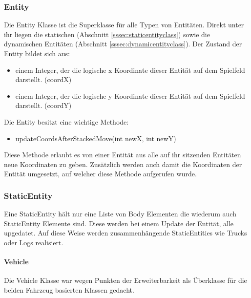 \documentclass[a4paper,10pt]{report}
\begin{document}
{{			\subsubsection{Entity}
			{
				\label{sssec:entityclass}
				
				Die Entity Klasse ist die Superklasse für alle Typen von Entitäten. 
				Direkt unter ihr liegen die statischen (Abschnitt \ref{sssec:staticentityclass}) sowie die dynamischen Entitäten (Abschnitt \ref{sssec:dynamicentityclass}).
				\newline \newline
				Der Zustand der Entity bildet sich aus:
							
				\begin{itemize}
					\item einem Integer, der die logische x Koordinate dieser Entität auf dem Spielfeld darstellt. (coordX)
					\item einem Integer, der die logische y Koordinate dieser Entität auf dem Spielfeld darstellt. (coordY)
				\end{itemize}
				\noindent
				Die Entity besitzt eine wichtige Methode: 

				\begin{itemize}
					\item updateCoordsAfterStackedMove(int newX, int newY)
				\end{itemize}								
				\noindent
				Diese Methode erlaubt es von einer Entität aus alle auf ihr sitzenden Entitäten neue Koordinaten zu geben. 
				Zusätzlich werden auch damit die Koordinaten der Entität umgesetzt, auf welcher diese Methode aufgerufen wurde.
			}			
			
			\subsubsection{StaticEntity}
			{
				\label{sssec:staticentityclass}
				
				Eine StaticEntity hält nur eine Liste von Body Elementen die wiederum auch StaticEntity Elemente sind. Diese werden bei einem Update der Entität, alle upgedatet. 
				Auf diese Weise werden zusammenhängende StaticEntities wie Trucks oder Logs realisiert.
				
				\paragraph{Vehicle}
				{
					Die Vehicle Klasse war wegen Punkten der Erweiterbarkeit als Überklasse für die beiden Fahrzeug basierten Klassen gedacht.
				}	
				
}}}
\end{document}
